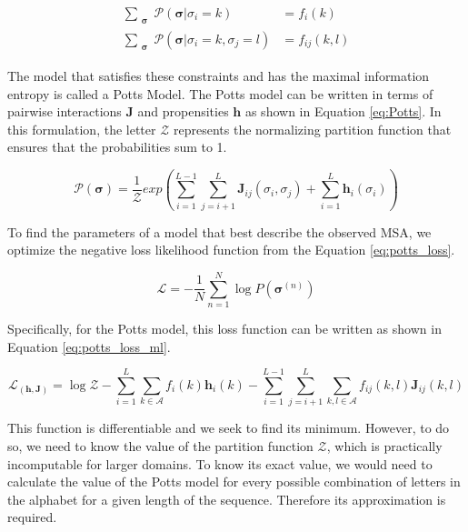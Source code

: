 \begin{equation}
    \begin{split}
        \sum_{\substack{\bm{\sigma}}} \mathcal{P}(\bm{\sigma} | \sigma_i = k) &= f_i(k) \\
        \sum_{\substack{\bm{\sigma}}} \mathcal{P}(\bm{\sigma} | \sigma_i = k, \sigma_j = l) &= f_{ij}(k, l)
    \end{split}
    \label{eq:potts_constraints}
\end{equation}
        
The model that satisfies these constraints and has the maximal information entropy is called a Potts Model.
The Potts model can be written in terms of pairwise interactions $\bm{J}$ and propensities $\bm{h}$ as shown in Equation \ref{eq:Potts}.         
In this formulation, the letter $\mathcal{Z}$ represents the normalizing partition function that ensures that the probabilities sum to 1.
        
\begin{equation}
    \mathcal{P}(\bm{\sigma}) = \frac{1}{\mathcal{Z}} exp\left(\sum_{i = 1}^{L-1} \sum_{j=i+1}^L \bm{J}_{ij}(\sigma_i, \sigma_j) + \sum_{i=1}^L \bm{h}_i({\sigma_i})\right)
    \label{eq:Potts}
\end{equation}
    
To find the parameters of a model that best describe the observed MSA, we optimize the negative loss likelihood function from the Equation \ref{eq:potts_loss}.
        
\begin{equation}
    \mathcal{L} = -\frac{1}{N} \sum_{n=1}^N \log P(\bm{\sigma}^{(n)})
    \label{eq:potts_loss}
\end{equation}
        
Specifically, for the Potts model, this loss function can be written as shown in Equation \ref{eq:potts_loss_ml}. 

\begin{equation}
    \mathcal{L}_(\bm{h}, \bm{J}) = \log \mathcal{Z} - \sum_{i = 1}^L \sum_{k \in \mathcal{A}} f_i(k)\bm{h}_i(k) - \sum_{i = 1}^{L-1} \sum_{j=i+1}^L \sum_{k, l \in \mathcal{A}} f_{ij}(k, l) \bm{J}_{ij}(k, l)
    \label{eq:potts_loss_ml}
\end{equation}
        
This function is differentiable and we seek to find its minimum. 
However, to do so, we need to know the value of the partition function $\mathcal{Z}$, which is practically incomputable for larger domains. 
To know its exact value, we would need to calculate the value of the Potts model for every possible combination of letters in the alphabet for a given length of the sequence. 
Therefore its approximation is required.
        
